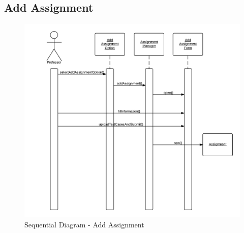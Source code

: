 \subsection*{Add Assignment}
\begin{figure}[H]
	\centering
	\includegraphics[width=\textwidth]{img/seqAddAssign}
	\caption{Sequential Diagram - Add Assignment}
\end{figure}